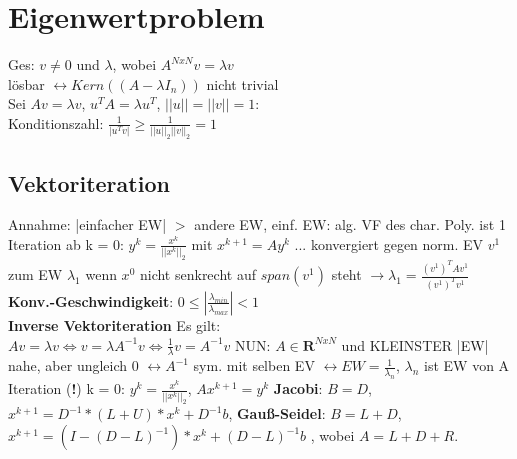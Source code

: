 \section{Eigenwertproblem}
Ges: $v \neq 0$ und $\lambda$, wobei $A^{NxN}v = \lambda v$\\
lösbar $\leftrightarrow Kern((A-\lambda I_n))$ nicht trivial\\
Sei $Av = \lambda v$, $u^TA = \lambda u^T$, $||u|| = ||v|| = 1$:\\
Konditionszahl: $\frac{1}{|u^Tv|} \geq \frac{1}{||u||_2||v||_2} = 1$
\subsection{Vektoriteration}
Annahme: |einfacher EW| $>$ andere EW, einf. EW: alg. VF des char. Poly. ist 1\\
Iteration ab k = 0: $y^k = \frac{x^k}{||x^k||_2}$ mit $x^{k+1} = Ay^k$ ... konvergiert gegen norm. EV $v^1$ zum EW $\lambda_1$ wenn $x^0$ nicht senkrecht auf $span(v^1)$ steht $\rightarrow \lambda_1 = \frac{(v^1)^TAv^1}{(v^1)^Tv^1}$\\
\textbf{Konv.-Geschwindigkeit}: $0 \leq |\frac{\lambda_{min}}{\lambda_{max}}| < 1$\\
\textbf{Inverse Vektoriteration} Es gilt:\\ $Av = \lambda v \Leftrightarrow v = \lambda A^{-1}v \Leftrightarrow \frac{1}{\lambda}v = A^{-1}v$
NUN: $A \in \mathbf{R}^{NxN}$ und KLEINSTER |EW| nahe, aber ungleich 0 $\leftrightarrow A^{-1}$ sym. mit selben EV $\leftrightarrow EW = \frac{1}{\lambda_n}$, $\lambda_n$ ist EW von A\\
Iteration (\textbf{!}) k = 0: $y^k = \frac{x^k}{||x^k||_2}$, $Ax^{k+1} = y^k$
\textbf{Jacobi}: $B = D$, $x^{k + 1} = D^{-1}*(L+U)*x^k + D^{-1}b$, 
\textbf{Gauß-Seidel}: $B = L + D$, $x^{k+1} = (I - (D-L)^{-1}) * x^k + (D-L)^{-1}b $
, wobei $A = L + D + R$.


